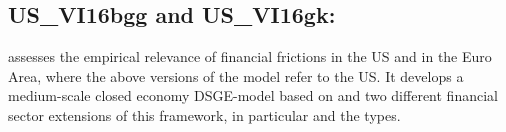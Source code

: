 \documentclass[11pt,a4paper]{article}
\begin{document}
\begin{itemize}
		
		
	\end{itemize}
	
	\subsection{US\_VI16bgg and US\_VI16gk: \texorpdfstring{\cite{villa2016}}{Villa (2016)}}
	\label{USVI16}
	\cite{villa2016} assesses the empirical relevance of financial frictions in the US and in the Euro Area, where the above versions of the model refer to the US. It develops a medium-scale closed economy DSGE-model based on \cite{SmetsWouters2007} and two different financial sector extensions of this framework, in particular \cite{bernanke1996financial} and the \cite{GertlerKaradi2011} types.
	
\end{document}

